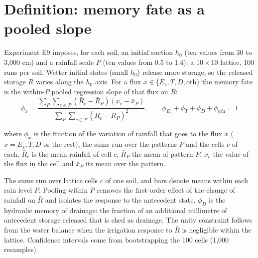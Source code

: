 \section{Definition: memory fate as a pooled slope}
Experiment E9 imposes, for each soil, an initial suction $h_0$ (ten values from 30 to 3,000 cm) and a rainfall scale $P$ (ten values from 0.5 to 1.4): a $10\times10$ lattice, 100 runs per soil. Wetter initial states (small $h_0$) release more storage, so the released storage $\bar R$ varies along the $h_0$ axis. For a flux $x\in\{E_s,T,D,\mathrm{oth}\}$ the memory fate is the within-$P$ pooled regression slope of that flux on $\bar R$:
\begin{equation}\label{eq:phi}
\boxed{\;\phi_x=\frac{\sum_P\sum_{c\in P}(\bar R_c-\bar R_P)(x_c-\bar x_P)}{\sum_P\sum_{c\in P}(\bar R_c-\bar R_P)^2},\qquad\phi_{E_s}+\phi_T+\phi_D+\phi_{\mathrm{oth}}=1\;}
\end{equation}
\par\noindent where $\phi_x$ is the fraction of the variation of rainfall that goes to the flux $x$ ($x=E_s,T,D$ or the rest), the sums run over the patterns $P$ and the cells $c$ of each, $\bar R_c$ is the mean rainfall of cell $c$, $\bar R_P$ the mean of pattern $P$, $x_c$ the value of the flux in the cell and $\bar x_P$ its mean over the pattern.

The sums run over lattice cells $c$ of one soil, and bars denote means within each rain level $P$. Pooling within $P$ removes the first-order effect of the change of rainfall on $\bar R$ and isolates the response to the antecedent state. $\phi_D$ is the hydraulic memory of drainage: the fraction of an additional millimetre of antecedent storage released that is shed as drainage. The unity constraint follows from the water balance when the irrigation response to $\bar R$ is negligible within the lattice. Confidence intervals come from bootstrapping the 100 cells (1,000 resamples).





